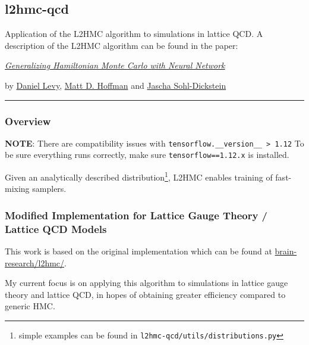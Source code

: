 \hypertarget{l2hmc-qcd}{%
\subsection{l2hmc-qcd}\label{l2hmc-qcd}}

Application of the L2HMC algorithm to simulations in lattice QCD. A
description of the L2HMC algorithm can be found in the paper:

\href{https://arxiv.org/abs/1711.09268}{\emph{Generalizing Hamiltonian
Monte Carlo with Neural Network}}

by \href{http://ai.stanford.edu/~danilevy}{Daniel Levy},
\href{http://matthewdhoffman.com/}{Matt D. Hoffman} and
\href{sohldickstein.com}{Jascha Sohl-Dickstein}

\begin{center}\rule{0.5\linewidth}{\linethickness}\end{center}

\hypertarget{overview}{%
\subsubsection{Overview}\label{overview}}

\textbf{NOTE}: There are compatibility issues with
\texttt{tensorflow.\_\_version\_\_\ \textgreater{}\ 1.12} To be sure
everything runs correctly, make sure \texttt{tensorflow==1.12.x} is
installed.

\vspace{10pt}
\noindent
Given an analytically described distribution\footnote{simple examples can be
found in \texttt{l2hmc-qcd/utils/distributions.py}}, L2HMC enables training of
fast-mixing samplers.
%
\hypertarget{modified-implementation-for-lattice-gauge-theory-lattice-qcd-models.}{%
  \subsubsection[Modified Implementation]{Modified Implementation for Lattice Gauge Theory / Lattice QCD
Models}%
\label{modified-implementation-for-lattice-gauge-theory-lattice-qcd-models.}}

This work is based on the original implementation which can be found at
\href{https://github.com/brain-research/l2hmc}{brain-research/l2hmc/}.
 
\vspace{10pt}
\noindent
My current focus is on applying this algorithm to simulations in lattice
gauge theory and lattice QCD, in hopes of obtaining greater efficiency
compared to generic HMC.

